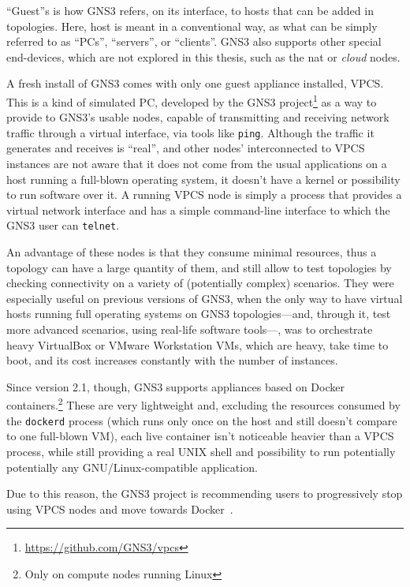 ``Guest''s is how GNS3 refers, on its interface, to hosts that can be added in topologies.
Here, host is meant in a conventional way, as what can be simply referred to as ``PCs'', ``servers'', or ``clients''.
GNS3 also supports other special end-devices, which are not explored in this thesis, such as the \acrshort{nat} or \emph{cloud} nodes.

A fresh install of GNS3 comes with only one guest appliance installed, VPCS.
This is a kind of simulated PC, developed by the GNS3 project\footnote{\url{https://github.com/GNS3/vpcs}} as a way to provide to GNS3's usable nodes, capable of transmitting and receiving network traffic through a virtual interface, via tools like \texttt{ping}.
Although the traffic it generates and receives is ``real'', and other nodes' interconnected to VPCS instances are not aware that it does not come from the usual applications on a host running a full-blown operating system, it doesn't have a kernel or possibility to run software over it.
A running VPCS node is simply a process that provides a virtual network interface and has a simple command-line interface to which the GNS3 user can \texttt{telnet}.

An advantage of these nodes is that they consume minimal resources, thus a topology can have a large quantity of them, and still allow to test topologies by checking connectivity on a variety of (potentially complex) scenarios.
They were especially useful on previous versions of GNS3, when the only way to have virtual hosts running full operating systems on GNS3 topologies---and, through it, test more advanced scenarios, using real-life software tools---, was to orchestrate heavy VirtualBox or VMware Workstation VMs, which are heavy, take time to boot, and its cost increases constantly with the number of instances.

Since version 2.1, though, GNS3 supports appliances based on Docker containers.\footnote{Only on compute nodes running Linux}
These are very lightweight and, excluding the resources consumed by the \texttt{dockerd} process (which runs only once on the host and still doesn't compare to one full-blown VM), each live container isn't noticeable heavier than a VPCS process, while still providing a real UNIX shell and possibility to run potentially potentially any GNU/Linux-compatible application.  %

Due to this reason, the GNS3 project is recommending users to progressively stop using VPCS nodes and move towards Docker~\cite{ytdynamipsvpcs}.

